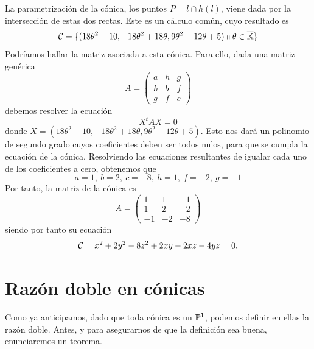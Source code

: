 \begin{exa}
	La parametrización de la cónica, los puntos $P=l\cap h(l)$, viene dada por la intersección de estas dos rectas. Este es un cálculo común, cuyo resultado es
	\begin{equation*}
		\mathcal{C}=\{(18\theta^2-10,-18\theta^2+18\theta,9\theta^2-12\theta+5)\shortparallel \theta\in\overline{\mathbb{K}}\}
	\end{equation*}
	Podríamos hallar la matriz asociada a esta cónica. Para ello, dada una matriz genérica
	\begin{equation*}
		A=\left( \begin{array}{ccc}
			a & h & g\\
			h & b & f\\
			g & f & c
		\end{array}\right) 
	\end{equation*}
	debemos resolver la ecuación
	\begin{equation*}
		X^tAX=0
	\end{equation*}
	donde $X=(18\theta^2-10,-18\theta^2+18\theta,9\theta^2-12\theta+5)$. Esto nos dará un polinomio de segundo grado cuyos coeficientes deben ser todos nulos, para que se cumpla la ecuación de la cónica. Resolviendo las ecuaciones resultantes de igualar cada uno de los coeficientes a cero, obtenemos que
	\begin{equation*}
		a=1, \ b=2, \ c=-8, \ h=1, \ f=-2, \ g=-1
	\end{equation*}
	Por tanto, la matriz de la cónica es
	\begin{equation*}
		A=\left( \begin{array}{ccc}
			1 & 1 & -1\\
			1 & 2 & -2\\
			-1 & -2 & -8
		\end{array}\right) 
	\end{equation*}
	siendo por tanto su ecuación
	\begin{equation*}
		\mathcal{C}=x^2+2y^2-8z^2+2xy-2xz-4yz=0.
	\end{equation*}
\end{exa}

\section{Razón doble en cónicas}
Como ya anticipamos, dado que toda cónica es un $\mathbb{P}^1$, podemos definir en ellas la razón doble. Antes, y para asegurarnos de que la definición sea buena, enunciaremos un teorema.

